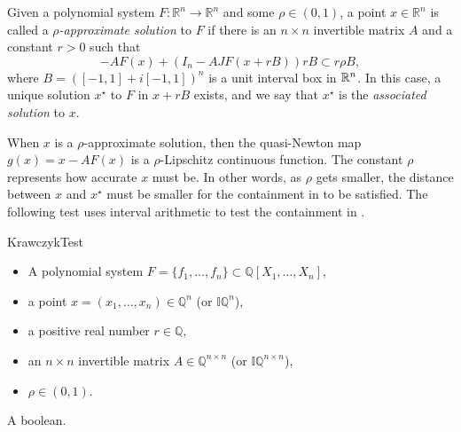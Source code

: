 \begin{definition}\label{def:approximate_solution}
    Given a polynomial system $F:\mathbb{R}^n\rightarrow\mathbb{R}^n$ and some $\rho\in (0,1)$, a point $x\in \mathbb{R}^n$ is called a \emph{$\rho$-approximate solution} to $F$ if there is an $n\times n$ invertible matrix $A$ and a constant $r>0$ such that  \begin{equation}\label{eq:krawczyk_test}
-AF(x)+\left(I_n-AJF(x+rB)\right)rB\subset r\rho B, 
    \end{equation}   where $B=([-1,1]+i[-1,1])^n$ is a unit interval box in ${\mathbb R}^n$.
    In this case, a unique solution $x^\star$ to $F$ in $x+rB$ exists, and we say that $x^\star$ is the \emph{associated solution} to $x$. 
\end{definition}

When $x$ is a $\rho$-approximate solution, then the quasi-Newton map $g(x)=x-AF(x)$ is a $\rho$-Lipschitz continuous function.  The constant $\rho$ represents how accurate $x$ must be.  In other words, as $\rho$ gets smaller, the distance between $x$ and $x^\star$ must be smaller for the containment in  to be satisfied. The following test uses interval arithmetic to test the containment in .

\algrenewcommand{}
\algrenewcommand{}

\begin{algorithm}[ht]
	\caption{KrawczykTest}
 \label{algo:Krawczyk-test}
\begin{algorithmic}[1]
\Require  
\begin{itemize}
    \item A polynomial system $F=\{f_1,\dots, f_n\}\subset\mathbb{Q}[X_1,\dots, X_n]$,
    \item a point $x=(x_1,\dots, x_n)\in \mathbb{Q}^n$ (or $\mathbb{IQ}^n$),
    \item a positive real number $r\in \mathbb{Q}$,
    \item an $n\times n$ invertible matrix $A\in\mathbb{Q}^{n\times n}$ (or $\mathbb{IQ}^{n\times n}$),
    \item $\rho\in (0,1)$.
\end{itemize}
\Ensure A boolean.
 \end{algorithmic}
 \end{algorithm}


